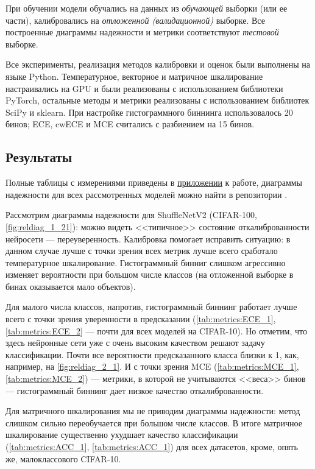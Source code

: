\documentclass[12pt]{article}
\begin{document}
При обучении модели обучались на данных из \emph{обучающей} выборки (или ее части), калибровались на \emph{отложенной (валидационной)} выборке. Все построенные диаграммы надежности и метрики соответствуют \emph{тестовой} выборке.

Все эксперименты, реализация методов калибровки и оценок были выполнены на языке Python. Температурное, векторное и матричное шкалирование настраивались на GPU и были реализованы с использованием библиотеки PyTorch, остальные методы и метрики реализованы с использованием библиотек SciPy и sklearn. При настройке гистограммного биннинга использовалось 20 бинов; ECE, cwECE и MCE считались с разбиением на 15 бинов.

\subsection{Результаты}
Полные таблицы с измерениями приведены в 
\hyperref[sec:appendix]{приложении} к работе, диаграммы надежности для всех рассмотренных моделей можно найти в репозитории \cite{my_repo}.

Рассмотрим диаграммы надежности для ShuffleNetV2 (CIFAR-100, \autoref{fig:reldiag_1_21}): можно видеть <<типичное>> состояние откалиброванности нейросети --- переуверенность. Калибровка помогает исправить ситуацию: в данном случае лучше с точки зрения всех метрик лучше всего сработало температурное шкалирование. Гистограммный бинниг слишком агрессивно изменяет вероятности при большом числе классов (на отложенной выборке в бинах оказывается мало объектов).

Для малого числа классов, напротив, гистограммный биннинг работает лучше всего с точки зрения уверенности в предсказании (\autoref{tab:metrics:ECE_1}, \autoref{tab:metrics:ECE_2} --- почти для всех моделей на CIFAR-10). Но отметим, что здесь нейронные сети уже с очень высоким качеством решают задачу классификации. Почти все вероятности предсказанного класса близки к 1, как, например, на \autoref{fig:reldiag_2_1}. И с точки зрения MCE (\autoref{tab:metrics:MCE_1}, \autoref{tab:metrics:MCE_2}) --- метрики, в которой не учитываются <<веса>> бинов --- гистограммный биннинг дает низкое качество откалиброванности.

Для матричного шкалирования мы не приводим диаграммы надежности: метод слишком сильно переобучается при большом числе классов. В итоге матричное шкалирование существенно ухудшает качество классификации (\autoref{tab:metrics:ACC_1}, \autoref{tab:metrics:ACC_1}) для всех датасетов, кроме, опять же, малоклассового CIFAR-10.
\end{document}
